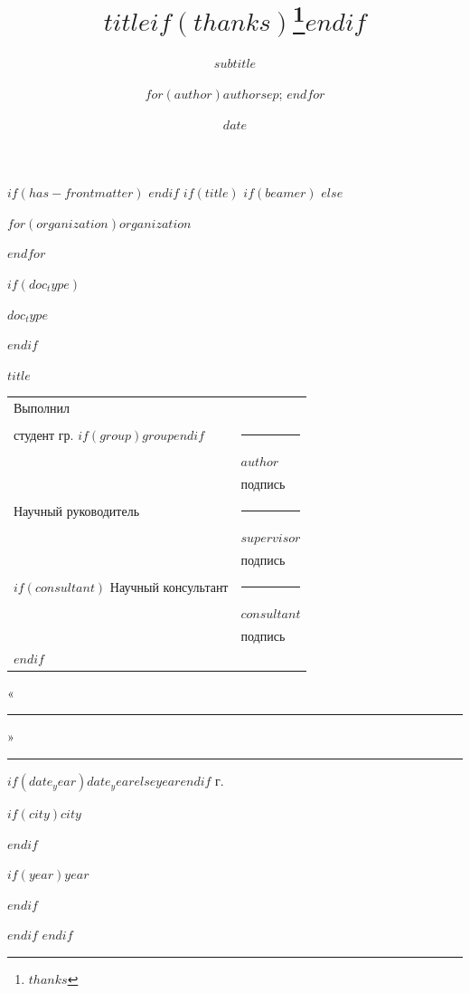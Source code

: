 \documentclass[
$if(fontsize)$
  $fontsize$,
$endif$
$if(papersize)$
  $papersize$paper,
$endif$
$if(beamer)$
  ignorenonframetext,
$if(handout)$
  handout,
$endif$
$if(aspectratio)$
  aspectratio=$aspectratio$,
$endif$
$endif$
$for(classoption)$
  $classoption$$sep$,
$endfor$
]{$documentclass$}
\title{$title$$if(thanks)$\thanks{$thanks$}$endif$}
\subtitle{$subtitle$}
\author{$for(author)$$author$$sep$; $endfor$}
\date{$date$}
\institute{$for(institute)$$institute$$sep$ \and $endfor$}
\begin{document}
$if(has-frontmatter)$
\frontmatter
$endif$
$if(title)$
$if(beamer)$
\frame{\titlepage}
$else$
\begin{titlepage}
\thispagestyle{empty}
\centering
{\fontsize{12}{15}\selectfont
$for(organization)$$organization$\par
$endfor$}
\vspace{1.1cm}
$if(doc_type)$
{\bfseries\fontsize{16}{19}\selectfont $doc_type$\par}
$endif$
\vspace{1.1cm}
{\bfseries\fontsize{14}{21}\selectfont $title$\par}
\vspace{3.0cm}
\begin{flushleft}
\hspace*{2.2cm}%
\begin{tabular}{@{}p{6.0cm}p{6.4cm}@{}}
Выполнил & \\
студент гр. $if(group)$$group$$endif$ & \rule{4.0cm}{0.5pt} \\
 & {\fontsize{12}{14}\selectfont\centering $author$\par} \\
 & {\fontsize{8}{10}\selectfont\centering подпись\par} \\[0.42cm]
Научный руководитель & \rule{4.0cm}{0.5pt} \\
 & {\fontsize{12}{14}\selectfont\centering $supervisor$\par} \\
 & {\fontsize{8}{10}\selectfont\centering подпись\par} \\[0.42cm]
$if(consultant)$
Научный консультант & \rule{4.0cm}{0.5pt} \\
 & {\fontsize{12}{14}\selectfont\centering $consultant$\par} \\
 & {\fontsize{8}{10}\selectfont\centering подпись\par} \\[0.42cm]
$endif$
\end{tabular}
\end{flushleft}
\vspace{0.9cm}
{\raggedleft «\rule{0.9cm}{0.5pt}» \rule{2.6cm}{0.5pt} $if(date_year)$$date_year$$else$$year$$endif$ г.\par}
\vfill
{\fontsize{12}{14}\selectfont $if(city)$$city$\par$endif$}
{\fontsize{12}{14}\selectfont $if(year)$$year$\par$endif$}
\end{titlepage}
\setcounter{page}{2}
$endif$
$endif$
\end{document}
